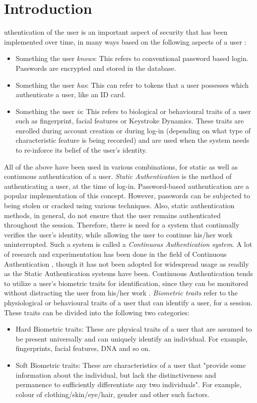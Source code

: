 \documentclass[%
        draft,
        notitlepage,
        narroweqnarray,
        inline,
        twoside,
        ]{ieee}
\begin{document}
\section{Introduction}
uthentication of the user is an important aspect of security that has been implemented over time, in many ways based on the following aspects of a user \cite{Klos00}:
\begin{itemize}
	\item Something the user \emph{knows}: This refers to conventional password based login. Passwords are encrypted and stored in the database.
	\item Something the user \emph{has}: This can refer to tokens that a user possesses which authenticate a user, like an ID card. 
	\item Something the user \emph{is}: This refers to biological or behavioural traits of a user such as fingerprint, facial features or Keystroke Dynamics\cite{mon00}. These traits are enrolled during account creation or during log-in (depending on what type of characteristic feature is being recorded) and are used when the system needs to re-inforce its belief of the user's identity.
\end{itemize}
All of the above have been used in various combinations, for static as well as continuous authentication of a user. \emph{Static Authentication} is the method of authenticating a user, at the time of log-in. Password-based authentication are a popular implementation of this concept. However, passwords can be subjected to being stolen or cracked using various techniques. Also, static authentication methods, in general, do not ensure that the user remains authenticated throughout the session. Therefore, there is need for a system that continually verifies the user's identity, while allowing the user to continue his/her work uninterrupted. Such a system is called a \emph{Continuous Authentication system}.
A lot of research and experimentation has been done in the field of Continuous Authentication \cite{Niin10,Klos00,mon00,turk03,sim07,azz08,azz082}, though it has not been adopted for widespread usage as readily as the Static Authentication systems have been. Continuous Authentication tends to utilize a user's biometric traits for identification, since they can be monitored without distracting the user from his/her work \cite{Klos00}. \emph{Biometric traits} refer to the physiological or behavioural traits of a user that can identify a user, for a session. These traits can be divided into the following two categories:
\begin{itemize}
	\item Hard Biometric traits: These are physical traits of a user that are assumed to be present universally and can uniquely identify an individual. For example, fingerprints, facial features, DNA and so on.
	\item Soft Biometric traits: These are characteristics of a user that "provide some information about the individual, but lack the distinctiveness and permanence to sufficiently differentiate any two individuals"\cite{Jain204}. For example, colour of clothing/skin/eye/hair, gender and other such factors.
\end{itemize}
\end{document}
